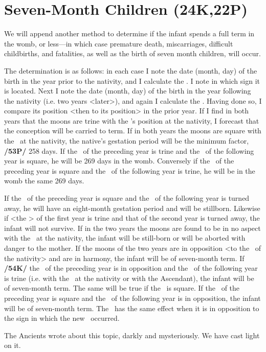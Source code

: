 \section{Seven-Month Children (24K,22P)}
We will append another method to determine if the infant spends a full term in the womb, or less—in which case premature death, miscarriages, difficult childbirths, and fatalities, as well as the birth of seven month children, will occur. 

The determination is as follows: in each case I note the date (month, day) of the birth in the year prior to the nativity, and I calculate the \Moon. I note in which sign it is located.
Next I note the date (month, day) of the birth in the year following the nativity (i.e. two years <later>), and
again I calculate the \Moon. Having done so, I compare its position <then to its position> in the prior year. If I find in both years that the moons are trine with the \Moon’s position at the nativity, I forecast that the conception will be carried to term. If in both years the moons are square with the \Moon\, at the nativity, the native’s gestation period will be the minimum factor, \textbf{/53P/} 258 days. If the \Moon\, of the preceding year is trine and the \Moon\, of the following year is square, he will be 269 days in the womb. Conversely if the \Moon\, of the preceding year is square and the \Moon\, of the following year is trine, he will be in the womb the same 269 days.

If the \Moon\, of the preceding year is square and the \Moon\, of the following year is turned away, he will
have an eight-month gestation period and will be stillborn. Likewise if <the \Moon> of the first year is trine and that of the second year is turned away, the infant will not survive. If in the two years the moons are found to be in no aspect with the \Moon\, at the nativity, the infant will be still-born or will be aborted with danger to the mother. If the moons of the two years are in opposition <to the \Moon\, of the nativity> and are in harmony, the infant will be of seven-month term. If \textbf{/54K/} the \Moon\, of the preceding year is in opposition and the \Moon\, of the following year is trine (i.e. with the \Moon\, at the nativity or with the Ascendant), the infant will be of seven-month term. The same will be true if the \Moon\, is square. If the \Moon\, of the preceding year is square and the \Moon\, of the following year is in opposition, the infant will be of seven-month term. The \Sun\, has the same effect when it is in opposition to the sign in which the new \Moon\, occurred.

The Ancients wrote about this topic, darkly and mysteriously. We have cast light on it.

\newpage